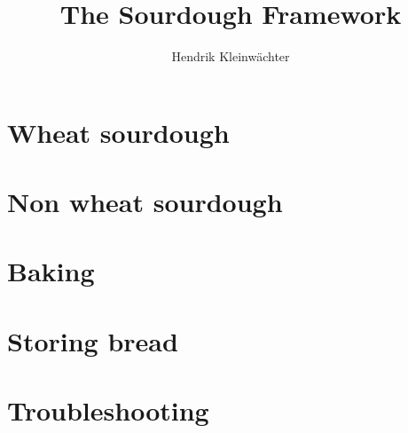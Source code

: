\documentclass[paper=a4, twoside=false, fontsize=12pt, parskip=half,
                bibliography=totoc, listof=totoc]{scrbook}
\author{Hendrik Kleinwächter}
\title{The Sourdough Framework}
\begin{document}

\titlepage

\frontmatter
{%
\hypersetup{hidelinks}
\ifdefined\HCode\else\tableofcontents\fi
}





\mainmatter













\chapter{Wheat sourdough}%
\label{chapter:wheat-sourdough}


\chapter{Non wheat sourdough}%
\label{chapter:non-wheat-sourdough}


% 
\chapter{Baking}%
\label{chapter:baking}


\chapter{Storing bread}%
\label{chapter:storing-bread}


\chapter{Troubleshooting}


\backmatter
\printbibliography
{%
\hypersetup{hidelinks}
\listofflowcharts
\listoftables
\listoffigures
}
\end{document}
